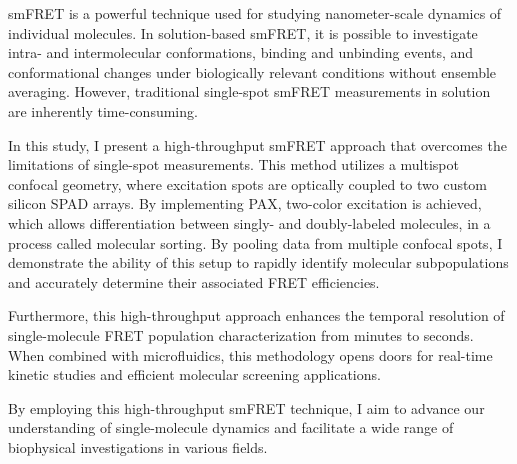 \ac{smFRET} is a powerful technique used for studying nanometer-scale dynamics of individual molecules. In solution-based smFRET, it is possible to investigate intra- and intermolecular conformations, binding and unbinding events, and conformational changes under biologically relevant conditions without ensemble averaging. 
However, traditional single-spot smFRET measurements in solution are inherently time-consuming.

In this study, I present a high-throughput smFRET approach that overcomes the limitations of single-spot measurements. This method utilizes a multispot confocal geometry, where excitation spots are optically coupled to two custom silicon \ac{SPAD} arrays. By implementing \ac{PAX}, two-color excitation is achieved, which allows differentiation between singly- and doubly-labeled molecules, in a process called molecular sorting. By pooling data from multiple confocal spots, I demonstrate the ability of this setup to rapidly identify molecular subpopulations and accurately determine their associated FRET efficiencies.

Furthermore, this high-throughput approach enhances the temporal resolution of single-molecule FRET population characterization from minutes to seconds. When combined with microfluidics, this methodology opens doors for real-time kinetic studies and efficient molecular screening applications.

By employing this high-throughput smFRET technique, I aim to advance our understanding of single-molecule dynamics and facilitate a wide range of biophysical investigations in various fields.


